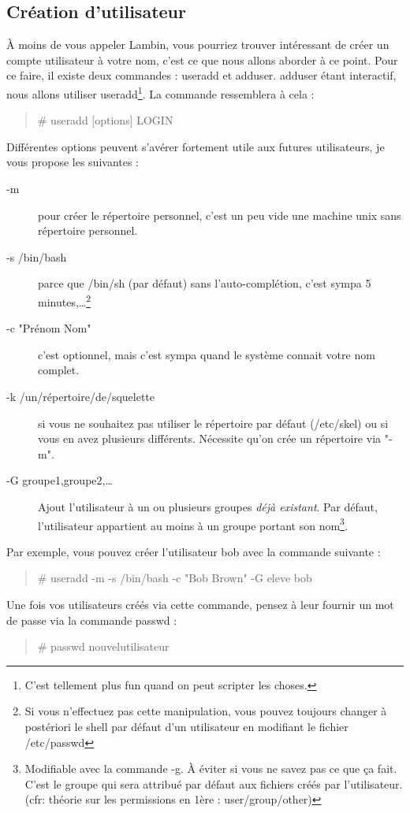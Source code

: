 \documentclass[a4paper,11pt]{article}
\newcommand{\commande}[1] {
    \begin{quote}
    \tt\raggedright #1 
    \end{quote}
}
\begin{document}
\subsection{Création d'utilisateur}
\par À moins de vous appeler Lambin, vous pourriez trouver intéressant de créer un compte utilisateur à votre nom, c'est ce que nous allons aborder à ce point. Pour ce faire, il existe deux commandes : useradd et adduser. adduser étant interactif, nous allons utiliser useradd\footnote{C'est tellement plus fun quand on peut scripter les choses.}. La commande ressemblera à cela :
\commande{\# useradd [options] LOGIN}
\par Différentes options peuvent s'avérer fortement utile aux futures utilisateurs, je vous propose les suivantes :
\begin{description}
    \item[-m] pour créer le répertoire personnel, c'est un peu vide une machine unix sans répertoire personnel.
    \item[-s /bin/bash] parce que /bin/sh (par défaut) sans l'auto-complétion, c'est sympa 5 minutes,\ldots\footnote{Si vous n'effectuez pas cette manipulation, vous pouvez toujours changer à postériori le shell par défaut d'un utilisateur en modifiant le fichier /etc/passwd}
    \item[-c "Prénom Nom"] c'est optionnel, mais c'est sympa quand le système connait votre nom complet.
    \item [-k /un/répertoire/de/squelette] si vous ne souhaitez pas utiliser le répertoire par défaut (/etc/skel) ou si vous en avez plusieurs différents. Nécessite qu'on crée un répertoire via "-m".
    \item[-G groupe1,groupe2,\dots] Ajout l'utilisateur à un ou plusieurs groupes \emph{déjà existant}. Par défaut, l'utilisateur appartient au moins à un groupe portant son nom\footnote{Modifiable avec la commande -g. À éviter si vous ne savez pas ce que ça fait. C'est le groupe qui sera attribué par défaut aux fichiers créés par l'utilisateur. (cfr: théorie sur les permissions en 1ère : user/group/other)}.
\end{description}
\par Par exemple, vous pouvez créer l'utilisateur bob avec la commande suivante :
\commande{\# useradd -m -s /bin/bash -c "Bob Brown" -G eleve bob}
\par Une fois vos utilisateurs créés via cette commande, pensez à leur fournir un mot de passe via la commande passwd :
\commande{\# passwd nouvelutilisateur}
\end{document}
